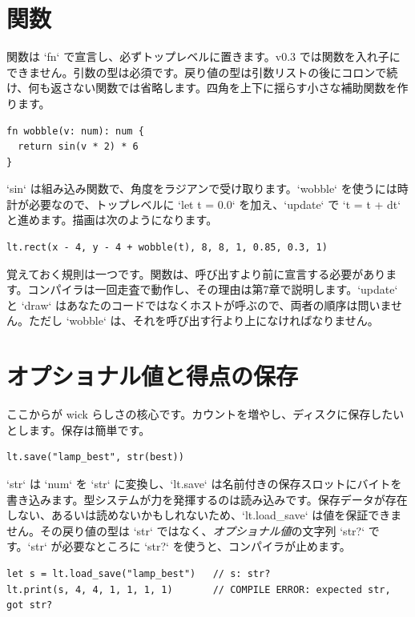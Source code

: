 \section{関数}

関数は `fn` で宣言し、必ずトップレベルに置きます。v0.3 では関数を入れ子にできません。引数の型は必須です。戻り値の型は引数リストの後にコロンで続け、何も返さない関数では省略します。四角を上下に揺らす小さな補助関数を作ります。

\begin{lstlisting}[language=wick]
fn wobble(v: num): num {
  return sin(v * 2) * 6
}
\end{lstlisting}

\noindent
`sin` は組み込み関数で、角度をラジアンで受け取ります。`wobble` を使うには時計が必要なので、トップレベルに `let t = 0.0` を加え、`update` で `t = t + dt` と進めます。描画は次のようになります。

\begin{lstlisting}[language=wick]
lt.rect(x - 4, y - 4 + wobble(t), 8, 8, 1, 0.85, 0.3, 1)
\end{lstlisting}

\noindent
覚えておく規則は一つです。関数は、呼び出すより前に宣言する必要があります。コンパイラは一回走査で動作し、その理由は第7章で説明します。`update` と `draw` はあなたのコードではなくホストが呼ぶので、両者の順序は問いません。ただし `wobble` は、それを呼び出す行より上になければなりません。

\section{オプショナル値と得点の保存}

ここからが wick らしさの核心です。カウントを増やし、ディスクに保存したいとします。保存は簡単です。

\begin{lstlisting}[language=wick]
lt.save("lamp_best", str(best))
\end{lstlisting}

\noindent
`str` は `num` を `str` に変換し、`lt.save` は名前付きの保存スロットにバイトを書き込みます。型システムが力を発揮するのは読み込みです。保存データが存在しない、あるいは読めないかもしれないため、`lt.load_save` は値を保証できません。その戻り値の型は `str` ではなく、\emph{オプショナル値}の文字列 `str?` です。`str` が必要なところに `str?` を使うと、コンパイラが止めます。

\begin{lstlisting}[language=wick]
let s = lt.load_save("lamp_best")   // s: str?
lt.print(s, 4, 4, 1, 1, 1, 1)       // COMPILE ERROR: expected str, got str?
\end{lstlisting}

